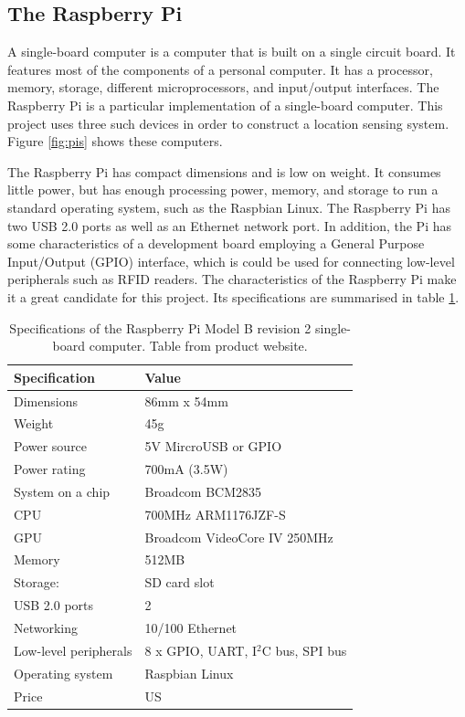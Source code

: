 \subsection{The Raspberry Pi}

A single-board computer is a computer that is built on a single circuit board. It features most of the components of a personal computer. It has a processor, memory, storage, different microprocessors, and input/output interfaces. The Raspberry Pi is a particular implementation of a single-board computer. This project uses three such devices in order to construct a location sensing system. Figure \ref{fig:pis} shows these computers.

The Raspberry Pi has compact dimensions and is low on weight. It consumes little power, but has enough processing power, memory, and storage to run a standard operating system, such as the Raspbian Linux. The Raspberry Pi has two USB 2.0 ports as well as an Ethernet network port. In addition, the Pi has some characteristics of a development board employing a General Purpose Input/Output (GPIO) interface, which is could be used for connecting low-level peripherals such as RFID readers. The characteristics of the Raspberry Pi make it a great candidate for this project. Its specifications are summarised in table \ref{tbl:pi}.

\begin{table}[h]
	\centering
	\begin{tabular}{ | m{4cm} || m{6cm} | }
		\hline
		\textbf{Specification}	& \textbf{Value} \\ \hline
		Dimensions				& 86mm x 54mm \\ \hline
		Weight					& 45g \\ \hline
		Power source			& 5V MircroUSB or GPIO \\ \hline
		Power rating			& 700mA (3.5W) \\ \hline
		System on a chip		& Broadcom BCM2835 \\ \hline
		CPU						& 700MHz ARM1176JZF-S \\ \hline
		GPU						& Broadcom VideoCore IV 250MHz \\ \hline
		Memory					& 512MB \\ \hline
		Storage:				& SD card slot \\ \hline
		USB	2.0 ports			& 2 \\ \hline
		Networking				& 10/100 Ethernet \\ \hline
		Low-level peripherals	& 8 x GPIO, UART, I$^{2}$C bus, SPI bus \\ \hline
		Operating system		& Raspbian Linux \\ \hline
		Price					& US \textdollar 35 \\ \hline
	\end{tabular}
	\caption{Specifications of the Raspberry Pi Model B revision 2 single-board computer. Table from product website\protect\footnotemark.}
	\label{tbl:pi}
\end{table}

